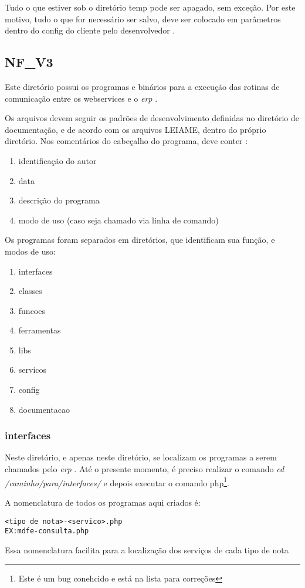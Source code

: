 \documentclass[a4paper]{article}
\newcommand{\erp}{\emph{erp} }
\newcommand{\dev}{desenvolvedor }
\begin{document}
Tudo o que estiver sob o diretório temp pode ser apagado, sem exceção. Por este motivo, tudo o que for necessário ser salvo, deve ser colocado em parâmetros dentro do config do cliente pelo \dev.

\subsection{NF\_V3}
Este diretório possui os programas e binários para a execução das rotinas de comunicação entre os webservices e o \erp.

Os arquivos devem seguir os padrões de desenvolvimento definidas no diretório de documentação, e de acordo com os arquivos LEIAME, dentro do próprio diretório. Nos comentários do cabeçalho do programa, deve conter :
\begin{enumerate}
	\item identificação do autor
	\item data
	\item descrição do programa
	\item modo de uso (caso seja chamado via linha de comando)
\end{enumerate}

Os programas foram separados em diretórios, que identificam sua função, e modos de uso:
\begin{enumerate}
	\item interfaces
	\item classes
	\item funcoes
	\item ferramentas
	\item libs
	\item servicos
	\item config
	\item documentacao
\end{enumerate}
\subsubsection{interfaces}
Neste diretório, e apenas neste diretório, se localizam os programas a serem chamados pelo \erp.
Até o presente momento, é preciso realizar o comando \emph{cd /caminho/para/interfaces/} e depois executar o comando php\footnote{Este é um bug conehcido e está na lista para correções}.

A nomenclatura de todos os programas aqui criados é:
\begin{lstlisting}
<tipo de nota>-<servico>.php
EX:mdfe-consulta.php
\end{lstlisting}
Essa nomenclatura facilita para a localização dos serviços de cada tipo de nota
\end{document}
